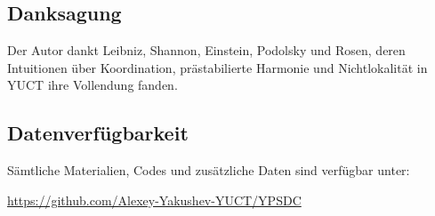\documentclass[12pt,a4paper]{article}
\begin{document}
	\subsection*{Danksagung}
	
	Der Autor dankt Leibniz, Shannon, Einstein, Podolsky und Rosen, deren Intuitionen über Koordination, prästabilierte Harmonie und Nichtlokalität in YUCT ihre Vollendung fanden.
	
	\subsection*{Datenverfügbarkeit}
	
	Sämtliche Materialien, Codes und zusätzliche Daten sind verfügbar unter:
	\begin{center}
		\url{https://github.com/Alexey-Yakushev-YUCT/YPSDC}
	\end{center}
	
\end{document}
